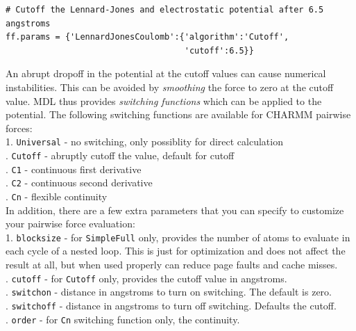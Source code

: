 \documentclass[11pt]{report}
\begin{document}
\begin{verbatim}
# Cutoff the Lennard-Jones and electrostatic potential after 6.5 angstroms
ff.params = {'LennardJonesCoulomb':{'algorithm':'Cutoff',
                                    'cutoff':6.5}}
\end{verbatim}

An abrupt dropoff in the potential at the cutoff values can
cause numerical instabilities.  This can be avoided by {\it smoothing}
the force to zero at the cutoff value.  MDL thus provides
{\it switching functions} which can be applied to the potential.
The following switching functions are available for CHARMM
pairwise forces: \\

1. \texttt{Universal} - no switching, only possiblity for direct calculation \\
. \texttt{Cutoff} - abruptly cutoff the value, default for cutoff \\
. \texttt{C1} - continuous first derivative \\
. \texttt{C2} - continuous second derivative \\
. \texttt{Cn} - flexible continuity \\

In addition, there are a few extra parameters that you can 
specify to customize your pairwise force evaluation: \\

1. \texttt{blocksize} - for \texttt{SimpleFull} only, provides
the number of atoms to evaluate in each cycle of a nested loop.
This is just for optimization and does not affect the result at all,
but when used properly can reduce page faults and cache misses. \\
. \texttt{cutoff} - for \texttt{Cutoff} only, provides the cutoff
value in angstroms. \\
. \texttt{switchon} - distance in angstroms to turn on switching.
The default is zero. \\
. \texttt{switchoff} - distance in angstroms to turn off switching.
Defaults the cutoff. \\
. \texttt{order} - for \texttt{Cn} switching function only, the
continuity. \\
\end{document}
